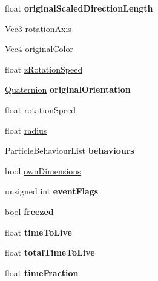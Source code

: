 \begin{DoxyCompactItemize}
float {\bfseries original\+Scaled\+Direction\+Length}
\item 
\hyperlink{classVec3}{Vec3} \hyperlink{structPUParticle3D_acc143a77013198fb296307e67fbe0388}{rotation\+Axis}
\item 
\hyperlink{classVec4}{Vec4} \hyperlink{structPUParticle3D_aab65944f122c1e6a1794d6db707527f8}{original\+Color}
\item 
float \hyperlink{structPUParticle3D_af9b4dbc93f32626b6065d03995b09e42}{z\+Rotation\+Speed}
\item 
\mbox{\label{structPUParticle3D_a80de8a4a58b1ade2a94df156078bb8ab}} 
\hyperlink{classQuaternion}{Quaternion} {\bfseries original\+Orientation}
\item 
float \hyperlink{structPUParticle3D_a57c73b86cc4f19f7b87665014cfe9dd4}{rotation\+Speed}
\item 
float \hyperlink{structPUParticle3D_a547376686a4c0e2ade7c8828c109f5e4}{radius}
\item 
\mbox{\label{structPUParticle3D_a8e9019cc0e04e28be9771abb968bf6cb}} 
Particle\+Behaviour\+List {\bfseries behaviours}
\item 
bool \hyperlink{structPUParticle3D_a294cf9e29d5e6ef8eaed9bd3b372a447}{own\+Dimensions}
\item 
\mbox{\label{structPUParticle3D_a88ccc6f36edb2643dae0b7adc58dd834}} 
unsigned int {\bfseries event\+Flags}
\item 
\mbox{\label{structPUParticle3D_abf0dc141b7ee6e2518d92536275484f5}} 
bool {\bfseries freezed}
\item 
\mbox{\label{structPUParticle3D_ae458750633001f503c4ab32c61e3b8e2}} 
float {\bfseries time\+To\+Live}
\item 
\mbox{\label{structPUParticle3D_a81c68098a2a472073ebfd06ec53b4bc8}} 
float {\bfseries total\+Time\+To\+Live}
\item 
\mbox{\label{structPUParticle3D_aef555deca414d6e6876d582255f1abca}} 
float {\bfseries time\+Fraction}
\item 
\mbox{\label{structPUParticle3D_aad46c02bfd40f9b140250925e662e149}} 

\end{DoxyCompactItemize}
